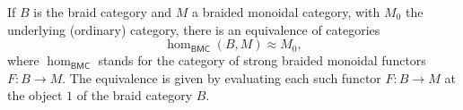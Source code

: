If $B$ is the braid category and $M$ a braided monoidal category, with $M_0$ the underlying (ordinary) category, there is an equivalence of categories
$$\hom_{\mathsf{BMC}}(B, M) \approx M_0,$$
where $\hom_{\mathsf{BMC}}$ stands for the category of strong braided monoidal functors $F : B \to M$. The equivalence is given by evaluating each such functor $F : B \to M$ at the object $1$ of the braid category $B$.
